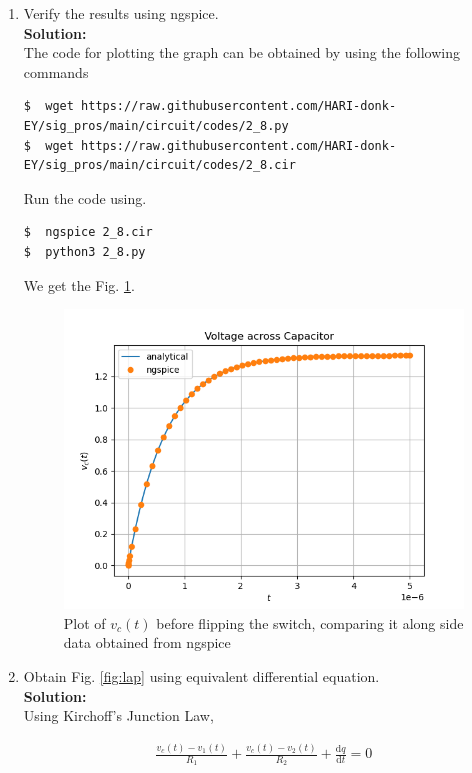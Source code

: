 \documentclass[journal,12pt,twocolumn]{IEEEtran}
\newcommand{\solution}{\noindent \textbf{Solution: }}
\providecommand{\der}[1]{\mathrm{d} #1}
\numberwithin{equation}{section}
\numberwithin{figure}{section}
\renewcommand\thesection{\arabic{section}}
\begin{document}
\begin{enumerate}[label=\thesection.\arabic*,ref=\thesection.\theenumi]
		\item Verify the results using ngspice.\\

		\solution\\
			The code for plotting the graph can be obtained by using the following commands

			\begin{lstlisting}
$  wget https://raw.githubusercontent.com/HARI-donk-EY/sig_pros/main/circuit/codes/2_8.py
$  wget https://raw.githubusercontent.com/HARI-donk-EY/sig_pros/main/circuit/codes/2_8.cir
			\end{lstlisting}

			Run the code using.

			\begin{lstlisting}
$  ngspice 2_8.cir
$  python3 2_8.py
			\end{lstlisting}

			We get the Fig. \ref{fig:2.8}.\\

			\begin{figure}[h]
				\begin{center}
					\includegraphics[width=0.7\columnwidth]{figs/2_8}
				\end{center}
				\caption{Plot of $v_c(t)$ before flipping the switch, comparing it along side data obtained from ngspice}
				\label{fig:2.8}
			\end{figure}
			
		\item Obtain Fig. \ref{fig:lap} using equivalent differential equation.\\

		\solution\\
			Using Kirchoff's Junction Law, 

			\begin{align}
				\frac{v_c(t) - v_1(t)}{R_1} + \frac{v_c(t) - v_2(t)}{R_2} + \frac{\der{q}}{\der{t}} = 0
			\end{align}


\end{enumerate}
\end{document}
